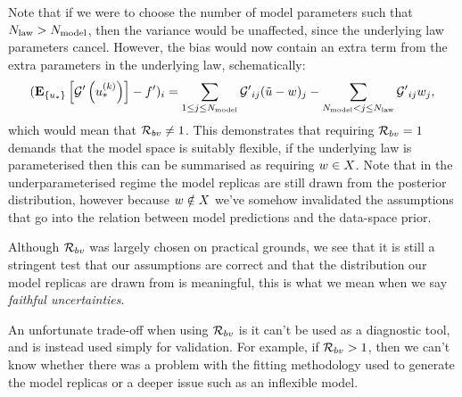 Note that if we were to choose the
number of model parameters such that $N_{\rm law} > N_{\rm model}$, then the variance
would be unaffected, since the underlying law parameters cancel. However, the
bias would now contain an extra term from the extra parameters in the
underlying law, schematically:
\begin{equation}
    \begin{split}
        (\mathbf{E}_{\{ u_* \}} \left[ {{\mathcal{G}}^{\prime}}\left(u_*^{(k)}\right) \right] - {{f}^{\prime}})_i =
        \sum_{1 \leq j \leq N_{\rm model}} {{\mathcal{G}}^{\prime}}_{ij} (\tilde{u} - w)_j -
        \sum_{N_{\rm model} < j \leq N_{\rm law}} {{\mathcal{G}}^{\prime}}_{ij} w_j,
    \end{split}
\end{equation}
which would mean that $\mathcal{R}_{bv} \neq 1$. This demonstrates that requiring
$\mathcal{R}_{bv} = 1$ demands that the model space is suitably flexible, if the
underlying law is parameterised then this can be summarised as requiring
$w \in X$. Note that in the
underparameterised regime the model replicas are still drawn from the posterior
distribution, however because $w \notin X$ we've somehow
invalidated the assumptions that go into the relation between model predictions
and the data-space prior.

Although $\mathcal{R}_{bv}$ was largely chosen on practical
grounds, we see that it is still a stringent test that our assumptions are
correct and that the distribution our model replicas are drawn from is meaningful,
this is what we mean when we say {\em faithful uncertainties}.

An unfortunate
trade-off when using $\mathcal{R}_{bv}$ is it can't be used as a diagnostic
tool, and is instead used simply for validation. For example, if
$\mathcal{R}_{bv} > 1$, then we
can't know whether there was a problem with the fitting methodology used to
generate the model replicas or a deeper issue such as an inflexible model.
